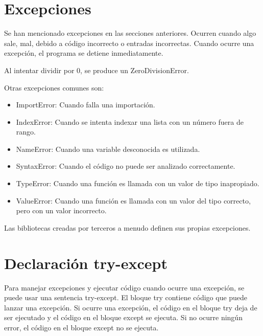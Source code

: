 \documentclass{report}
\begin{document}
\section{Excepciones}

Se han mencionado excepciones en las secciones anteriores. Ocurren cuando algo sale, mal, debido a código incorrecto o entradas incorrectas. Cuando ocurre una excepción, el programa se detiene inmediatamente.\smallskip

Al intentar dividir por 0, se produce un ZeroDivisionError.


Otras excepciones comunes son:

\begin{itemize}
  \item ImportError: Cuando falla una importación.
  
  \item IndexError: Cuando se intenta indexar una lista con un número fuera de rango.
  
  \item NameError: Cuando una variable desconocida es utilizada.
  
  \item SyntaxError: Cuando el código no puede ser analizado correctamente.
  
  \item TypeError: Cuando una función es llamada con un valor de tipo inapropiado.
  
  \item ValueError: Cuando una función es llamada con un valor del tipo correcto, pero con un valor incorrecto.
  
\end{itemize}

Las bibliotecas creadas por terceros a menudo definen sus propias excepciones.

\section{Declaración try-except}

Para manejar excepciones y ejecutar código cuando ocurre una excepción, se puede usar una sentencia try-except. El bloque try contiene código que puede lanzar una excepción. Si ocurre una excepción, el código en el bloque try deja de ser ejecutado y el código en el bloque except se ejecuta. Si no ocurre ningún error, el código en el bloque except no se ejecuta.
\end{document}
